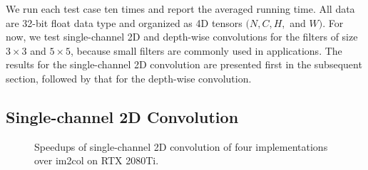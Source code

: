 We run each test case ten times and report the averaged running time. All data are 32-bit float data type and organized as 4D tensors $(N,C,H,$ and $W)$. For
now, we test single-channel 2D and depth-wise convolutions for the filters of size $3 \times 3$ and $5 \times 5$, because small filters are commonly used in applications. The results for the single-channel 2D convolution are presented first in the subsequent section, followed by that for the depth-wise convolution.

\subsection{Single-channel 2D Convolution}
\begin{figure}
\centering

\hspace{0em}
	
\caption{Speedups of single-channel 2D convolution of four implementations over im2col on RTX 2080Ti.}
\label{fig:2druntime}
\end{figure}

